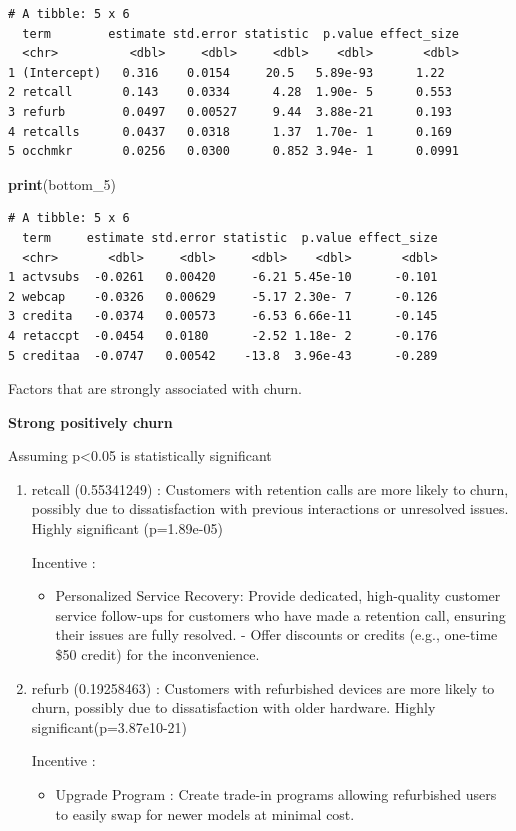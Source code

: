 \documentclass[
]{article}
\newenvironment{Shaded}{\begin{snugshade}}{\end{snugshade}}
\newcommand{\FunctionTok}[1]{\textcolor[rgb]{0.13,0.29,0.53}{\textbf{#1}}}
\newcommand{\NormalTok}[1]{#1}
\providecommand{\tightlist}{%
  \setlength{\itemsep}{0pt}\setlength{\parskip}{0pt}}
\begin{document}
\begin{verbatim}
# A tibble: 5 x 6
  term        estimate std.error statistic  p.value effect_size
  <chr>          <dbl>     <dbl>     <dbl>    <dbl>       <dbl>
1 (Intercept)   0.316    0.0154     20.5   5.89e-93      1.22  
2 retcall       0.143    0.0334      4.28  1.90e- 5      0.553 
3 refurb        0.0497   0.00527     9.44  3.88e-21      0.193 
4 retcalls      0.0437   0.0318      1.37  1.70e- 1      0.169 
5 occhmkr       0.0256   0.0300      0.852 3.94e- 1      0.0991
\end{verbatim}

\begin{Shaded}
\begin{Highlighting}[]
\FunctionTok{print}\NormalTok{(bottom\_5)}
\end{Highlighting}
\end{Shaded}

\begin{verbatim}
# A tibble: 5 x 6
  term     estimate std.error statistic  p.value effect_size
  <chr>       <dbl>     <dbl>     <dbl>    <dbl>       <dbl>
1 actvsubs  -0.0261   0.00420     -6.21 5.45e-10      -0.101
2 webcap    -0.0326   0.00629     -5.17 2.30e- 7      -0.126
3 credita   -0.0374   0.00573     -6.53 6.66e-11      -0.145
4 retaccpt  -0.0454   0.0180      -2.52 1.18e- 2      -0.176
5 creditaa  -0.0747   0.00542    -13.8  3.96e-43      -0.289
\end{verbatim}

Factors that are strongly associated with churn.

\textbf{Strong positively churn}

Assuming p\textless0.05 is statistically significant

\begin{enumerate}
\def\labelenumi{\arabic{enumi}.}
\item
  retcall (0.55341249) : Customers with retention calls are more likely
  to churn, possibly due to dissatisfaction with previous interactions
  or unresolved issues. Highly significant (p=1.89e-05)

  Incentive :

  \begin{itemize}
  \tightlist
  \item
    Personalized Service Recovery: Provide dedicated, high-quality
    customer service follow-ups for customers who have made a retention
    call, ensuring their issues are fully resolved. - Offer discounts or
    credits (e.g., one-time \$50 credit) for the inconvenience.
  \end{itemize}
\item
  refurb (0.19258463) : Customers with refurbished devices are more
  likely to churn, possibly due to dissatisfaction with older hardware.
  Highly significant(p=3.87e10-21)

  Incentive :

  \begin{itemize}
  \tightlist
  \item
    Upgrade Program : Create trade-in programs allowing refurbished
    users to easily swap for newer models at minimal cost.
  \end{itemize}
\end{enumerate}
\end{document}
